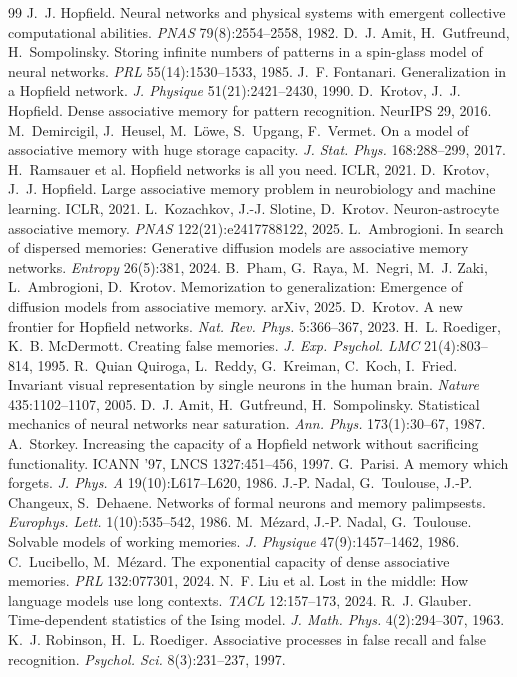 \documentclass[10pt,a4paper]{article}
\begin{document}
\begin{thebibliography}{99}\small
{} J.~J. Hopfield. Neural networks and physical systems with emergent collective computational abilities. \emph{PNAS} 79(8):2554--2558, 1982.
 D.~J. Amit, H.~Gutfreund, H.~Sompolinsky. Storing infinite numbers of patterns in a spin-glass model of neural networks. \emph{PRL} 55(14):1530--1533, 1985.
 J.~F. Fontanari. Generalization in a Hopfield network. \emph{J. Physique} 51(21):2421--2430, 1990.
 D.~Krotov, J.~J. Hopfield. Dense associative memory for pattern recognition. NeurIPS 29, 2016.
 M.~Demircigil, J.~Heusel, M.~L\"owe, S.~Upgang, F.~Vermet. On a model of associative memory with huge storage capacity. \emph{J. Stat. Phys.} 168:288--299, 2017.
 H.~Ramsauer et al. Hopfield networks is all you need. ICLR, 2021.
 D.~Krotov, J.~J. Hopfield. Large associative memory problem in neurobiology and machine learning. ICLR, 2021.
 L.~Kozachkov, J.-J. Slotine, D.~Krotov. Neuron-astrocyte associative memory. \emph{PNAS} 122(21):e2417788122, 2025.
 L.~Ambrogioni. In search of dispersed memories: Generative diffusion models are associative memory networks. \emph{Entropy} 26(5):381, 2024.
 B.~Pham, G.~Raya, M.~Negri, M.~J. Zaki, L.~Ambrogioni, D.~Krotov. Memorization to generalization: Emergence of diffusion models from associative memory. arXiv, 2025.
 D.~Krotov. A new frontier for Hopfield networks. \emph{Nat. Rev. Phys.} 5:366--367, 2023.
 H.~L. Roediger, K.~B. McDermott. Creating false memories. \emph{J. Exp. Psychol. LMC} 21(4):803--814, 1995.
 R.~Quian Quiroga, L.~Reddy, G.~Kreiman, C.~Koch, I.~Fried. Invariant visual representation by single neurons in the human brain. \emph{Nature} 435:1102--1107, 2005.
 D.~J. Amit, H.~Gutfreund, H.~Sompolinsky. Statistical mechanics of neural networks near saturation. \emph{Ann. Phys.} 173(1):30--67, 1987.
 A.~Storkey. Increasing the capacity of a Hopfield network without sacrificing functionality. ICANN '97, LNCS 1327:451--456, 1997.
 G.~Parisi. A memory which forgets. \emph{J. Phys. A} 19(10):L617--L620, 1986.
 J.-P. Nadal, G.~Toulouse, J.-P. Changeux, S.~Dehaene. Networks of formal neurons and memory palimpsests. \emph{Europhys. Lett.} 1(10):535--542, 1986.
 M.~M\'ezard, J.-P. Nadal, G.~Toulouse. Solvable models of working memories. \emph{J. Physique} 47(9):1457--1462, 1986.
 C.~Lucibello, M.~M\'ezard. The exponential capacity of dense associative memories. \emph{PRL} 132:077301, 2024.
 N.~F. Liu et al. Lost in the middle: How language models use long contexts. \emph{TACL} 12:157--173, 2024.
 R.~J. Glauber. Time-dependent statistics of the Ising model. \emph{J. Math. Phys.} 4(2):294--307, 1963.
 K.~J. Robinson, H.~L. Roediger. Associative processes in false recall and false recognition. \emph{Psychol. Sci.} 8(3):231--237, 1997.
\end{thebibliography}
\end{document}
